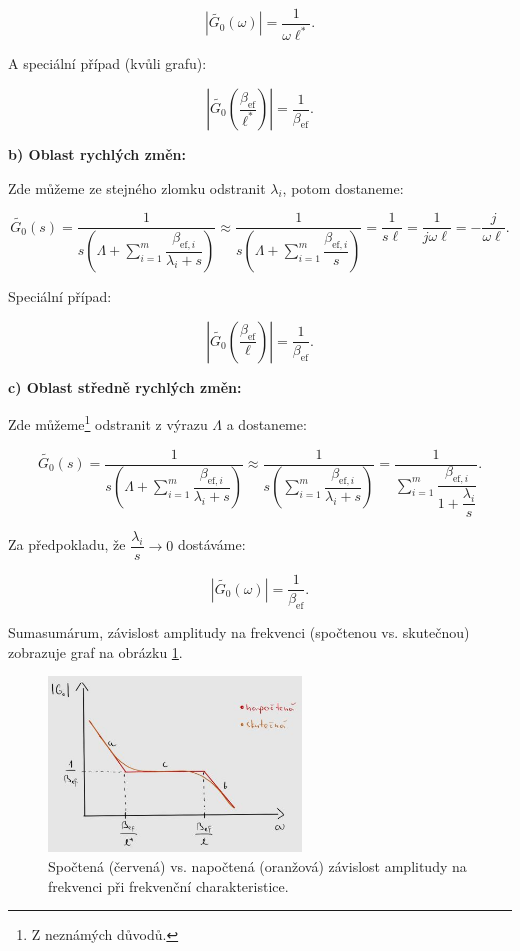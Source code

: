 $$ |\tilde{G_0}(\omega)| = \dfrac{1}{\omega \ell^*}. $$

A speciální případ (kvůli grafu):

$$ \left |\tilde{G_0} \left ( \dfrac{\beta_{\text{ef}}}{\ell^*} \right ) \right | = \dfrac{1}{\beta_{\text{ef}}}. $$

\textbf{b) Oblast rychlých změn:}

Zde můžeme ze stejného zlomku odstranit $\lambda_i$, potom dostaneme:

$$ \tilde{G_0}(s) = \dfrac{1}{s \left ( \Lambda + \sum_{i=1}^m \dfrac{\beta_{\text{ef},i}}{\lambda_i + s} \right )} \approx \dfrac{1}{s \left ( \Lambda + \sum_{i=1}^m \dfrac{\beta_{\text{ef},i}}{s} \right )} = \dfrac{1}{s \ell} = \dfrac{1}{j \omega \ell} = - \dfrac{j}{\omega \ell}. $$

Speciální případ:

$$ \left |\tilde{G_0} \left ( \dfrac{\beta_{\text{ef}}}{\ell} \right ) \right | = \dfrac{1}{\beta_{\text{ef}}}. $$

\textbf{c) Oblast středně rychlých změn:}

Zde můžeme\footnote{Z neznámých důvodů.} odstranit z výrazu $\Lambda$ a dostaneme:

$$ \tilde{G_0}(s) = \dfrac{1}{s \left ( \Lambda + \sum_{i=1}^m \dfrac{\beta_{\text{ef},i}}{\lambda_i + s} \right )} \approx \dfrac{1}{s \left ( \sum_{i=1}^m \dfrac{\beta_{\text{ef},i}}{\lambda_i + s} \right )} = \dfrac{1}{\sum_{i=1}^m \dfrac{\beta_{\text{ef},i}}{1 + \dfrac{\lambda_i}{s}} }. $$

Za předpokladu, že $\dfrac{\lambda_i}{s} \rightarrow 0$ dostáváme:

$$ \left |\tilde{G_0} \left (\omega \right ) \right | = \dfrac{1}{\beta_{\text{ef}}}. $$

Sumasumárum, závislost amplitudy na frekvenci (spočtenou vs. skutečnou) zobrazuje graf na obrázku \ref{fig_amplituda_frekvence}.

\begin{figure}[H]
  \centering
  \includegraphics[width=0.6\textwidth]{img/amplituda_frekvence.jpg}
  \caption{Spočtená (červená) vs. napočtená (oranžová) závislost amplitudy na frekvenci při frekvenční charakteristice.}
  \label{fig_amplituda_frekvence}
\end{figure}

